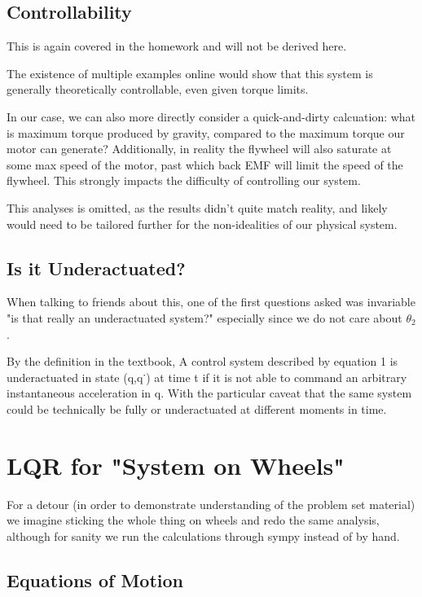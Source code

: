 \documentclass[conference]{IEEEtran}
\begin{document}
\subsection{Controllability}

This is again covered in the homework and will not be derived here.

The existence of multiple examples online would show that this system is
generally theoretically controllable, even given torque limits. 

In our case, we can also more directly consider a quick-and-dirty calcuation:
what is maximum torque produced by gravity, compared to the maximum torque our
motor can generate? Additionally, in reality the flywheel will also saturate at
some max speed of the motor, past which back EMF will limit the speed of the
flywheel. This strongly impacts the difficulty of controlling our system. 

This analyses is omitted, as the results didn't quite match reality, and likely
would need to be tailored further for the non-idealities of our physical system.


\subsection{Is it Underactuated?}

When talking to friends about this, one of the first questions asked was
invariable "is that really an underactuated system?" especially since we do not
care about $\theta_2$.

By the definition in the textbook, 
    A control system described by equation 1 is underactuated in state (q,q˙) at
    time t if it is not able to command an arbitrary instantaneous acceleration
    in q.
With the particular caveat that the same system could be technically be fully or underactuated at different moments in time.

\section{LQR for "System on Wheels"}


For a detour (in order to demonstrate understanding of the problem set material)
we imagine sticking the whole thing on wheels and redo the same analysis,
although for sanity we run the calculations through sympy instead of by hand.


\subsection{Equations of Motion}
\end{document}
